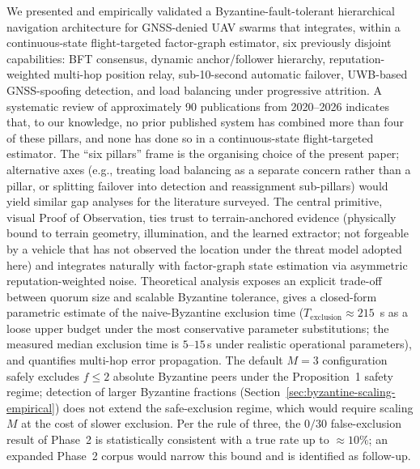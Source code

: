 \documentclass[journal,10pt,twocolumn]{IEEEtran}
\begin{document}
We presented and empirically validated a Byzantine-fault-tolerant hierarchical navigation architecture for GNSS-denied UAV swarms that integrates, within a continuous-state flight-targeted factor-graph estimator, six previously disjoint capabilities: BFT consensus, dynamic anchor/follower hierarchy, reputation-weighted multi-hop position relay, sub-10-second automatic failover, UWB-based GNSS-spoofing detection, and load balancing under progressive attrition. A systematic review of approximately 90 publications from 2020--2026 indicates that, to our knowledge, no prior published system has combined more than four of these pillars, and none has done so in a continuous-state flight-targeted estimator. The ``six pillars'' frame is the organising choice of the present paper; alternative axes (e.g., treating load balancing as a separate concern rather than a pillar, or splitting failover into detection and reassignment sub-pillars) would yield similar gap analyses for the literature surveyed. The central primitive, visual Proof of Observation, ties trust to terrain-anchored evidence (physically bound to terrain geometry, illumination, and the learned extractor; not forgeable by a vehicle that has not observed the location under the threat model adopted here) and integrates naturally with factor-graph state estimation via asymmetric reputation-weighted noise. Theoretical analysis exposes an explicit trade-off between quorum size and scalable Byzantine tolerance, gives a closed-form parametric estimate of the naive-Byzantine exclusion time ($T_\text{exclusion}\approx 215$~s as a loose upper budget under the most conservative parameter substitutions; the measured median exclusion time is $5$--$15$\,s under realistic operational parameters), and quantifies multi-hop error propagation. The default $M{=}3$ configuration safely excludes $f\leq 2$ absolute Byzantine peers under the Proposition~1 safety regime; detection of larger Byzantine fractions (Section~\ref{sec:byzantine-scaling-empirical}) does not extend the safe-exclusion regime, which would require scaling $M$ at the cost of slower exclusion. Per the rule of three, the $0/30$ false-exclusion result of Phase~2 is statistically consistent with a true rate up to $\approx 10\%$; an expanded Phase~2 corpus would narrow this bound and is identified as follow-up.
\end{document}
